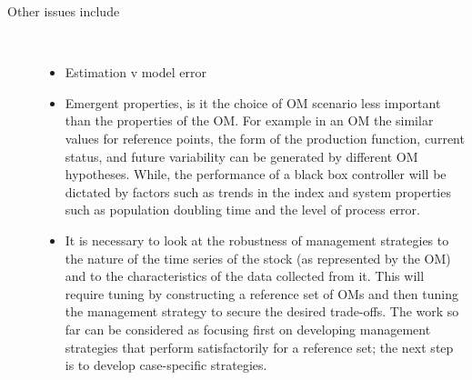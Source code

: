 \begin{description}
    \item[Other issues include]~
    \begin{itemize}
        \item Estimation v model error
        \item Emergent properties, is it the choice of OM scenario less important than the properties of the OM. For example in an OM the similar values for reference points, the form of the production function, current status, and future variability can be generated by different OM hypotheses. While, the performance of a black box controller will be dictated by factors such as trends in the index and system properties such as population doubling time and the level of process error. 
        \item %
        It is necessary to look at the robustness of management strategies to the nature of the time series of the stock (as represented by the OM) and to the characteristics of the data collected from it. This will require tuning by constructing a reference set of OMs and then tuning the management strategy to secure the desired trade-offs. The work so far can be considered as focusing first on developing management strategies that perform satisfactorily for a reference set; the next step is to develop case-specific strategies.
\end{itemize}
\end{description}

